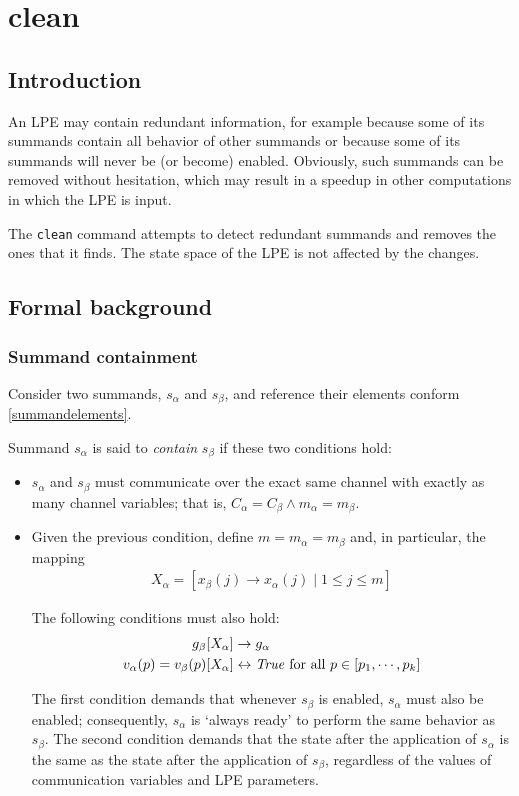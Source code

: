 \chapter{clean} \label{clean}

\section{Introduction}

An LPE may contain redundant information, for example because some of its summands contain all behavior of other summands or because some of its summands will never be (or become) enabled.
Obviously, such summands can be removed without hesitation, which may result in a speedup in other computations in which the LPE is input.

The \texttt{clean} command attempts to detect redundant summands and removes the ones that it finds.
The state space of the LPE is not affected by the changes.

\section{Formal background}

\subsection{Summand containment}

Consider two summands, $s_\alpha$ and $s_\beta$, and reference their elements conform \ref{summandelements}.

Summand $s_\alpha$ is said to \emph{contain} $s_\beta$ if these two conditions hold:

\begin{itemize}
\item $s_\alpha$ and $s_\beta$ must communicate over the exact same channel with exactly as many channel variables; that is, $C_\alpha = C_\beta \land m_\alpha = m_\beta$.

\item Given the previous condition, define $m = m_\alpha = m_\beta$ and, in particular, the mapping
\begin{align*}
X_\alpha = [x_\beta(j) \rightarrow x_\alpha(j) \;|\; 1 \leq j \leq m]
\end{align*}

The following conditions must also hold:
\begin{align*}
g_\beta[X_\alpha] &\rightarrow g_\alpha \\
v_\alpha(p) = v_\beta(p)[X_\alpha] &\leftrightarrow \text{\textit{True}} \text{ for all } p \in [p_1, \cdots{}, p_k]
\end{align*}

The first condition demands that whenever $s_\beta$ is enabled, $s_\alpha$ must also be enabled; consequently, $s_\alpha$ is `always ready' to perform the same behavior as $s_\beta$.
The second condition demands that the state after the application of $s_\alpha$ is the same as the state after the application of $s_\beta$, regardless of the values of communication variables and LPE parameters.
\end{itemize}

